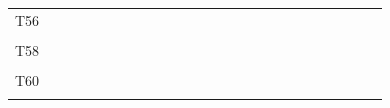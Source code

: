 \documentclass[
]{article}
\begin{document}
\begin{longtable}[l]{lllllllllllllllllllllllll}
\addlinespace
T56 &  &  &  &  &  &  &  &  &  &  &  &  &  &  &  &  &  &  &  &  &  &  &  & \\
\cellcolor{gray!6}{T57} & \cellcolor{gray!6}{} & \cellcolor{gray!6}{} & \cellcolor{gray!6}{} & \cellcolor{gray!6}{} & \cellcolor{gray!6}{} & \cellcolor{gray!6}{} & \cellcolor{gray!6}{} & \cellcolor{gray!6}{} & \cellcolor{gray!6}{} & \cellcolor{gray!6}{} & \cellcolor{gray!6}{} & \cellcolor{gray!6}{} & \cellcolor{gray!6}{} & \cellcolor{gray!6}{} & \cellcolor{gray!6}{} & \cellcolor{gray!6}{} & \cellcolor{gray!6}{} & \cellcolor{gray!6}{} & \cellcolor{gray!6}{} & \cellcolor{gray!6}{} & \cellcolor{gray!6}{} & \cellcolor{gray!6}{} & \cellcolor{gray!6}{} & \cellcolor{gray!6}{}\\
T58 &  &  &  &  &  &  &  &  &  &  &  &  &  &  &  &  &  &  &  &  &  &  &  & \\
\cellcolor{gray!6}{T59} & \cellcolor{gray!6}{} & \cellcolor{gray!6}{} & \cellcolor{gray!6}{} & \cellcolor{gray!6}{} & \cellcolor{gray!6}{} & \cellcolor{gray!6}{} & \cellcolor{gray!6}{} & \cellcolor{gray!6}{} & \cellcolor{gray!6}{} & \cellcolor{gray!6}{} & \cellcolor{gray!6}{} & \cellcolor{gray!6}{} & \cellcolor{gray!6}{} & \cellcolor{gray!6}{} & \cellcolor{gray!6}{} & \cellcolor{gray!6}{} & \cellcolor{gray!6}{} & \cellcolor{gray!6}{} & \cellcolor{gray!6}{} & \cellcolor{gray!6}{} & \cellcolor{gray!6}{} & \cellcolor{gray!6}{} & \cellcolor{gray!6}{} & \cellcolor{gray!6}{}\\
T60 &  &  &  &  &  &  &  &  &  &  &  &  &  &  &  &  &  &  &  &  &  &  &  & \\
\addlinespace
\cellcolor{gray!6}{T61} & \cellcolor{gray!6}{} & \cellcolor{gray!6}{} & \cellcolor{gray!6}{} & \cellcolor{gray!6}{} & \cellcolor{gray!6}{} & \cellcolor{gray!6}{} & \cellcolor{gray!6}{} & \cellcolor{gray!6}{} & \cellcolor{gray!6}{} & \cellcolor{gray!6}{} & \cellcolor{gray!6}{} & \cellcolor{gray!6}{} & \cellcolor{gray!6}{} & \cellcolor{gray!6}{} & \cellcolor{gray!6}{} & \cellcolor{gray!6}{} & \cellcolor{gray!6}{} & \cellcolor{gray!6}{} & \cellcolor{gray!6}{} & \cellcolor{gray!6}{} & \cellcolor{gray!6}{} & \cellcolor{gray!6}{} & \cellcolor{gray!6}{} & \cellcolor{gray!6}{}\\*
\end{longtable}
\end{document}
